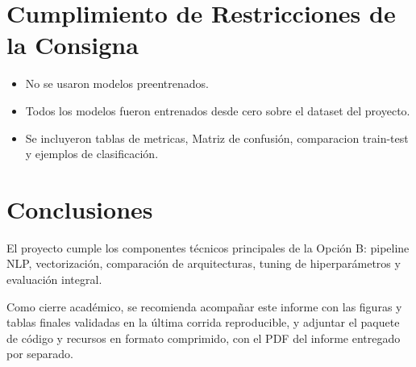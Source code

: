 ﻿\documentclass[12pt,a4paper]{article}
\begin{document}
\section{Cumplimiento de Restricciones de la Consigna}
\begin{itemize}
  \item No se usaron modelos preentrenados.
  \item Todos los modelos fueron entrenados desde cero sobre el dataset del proyecto.
  \item Se incluyeron tablas de metricas, Matriz de confusión, comparacion train-test y ejemplos de clasificación.
\end{itemize}

\section{Conclusiones}
El proyecto cumple los componentes técnicos principales de la Opción B: pipeline NLP, vectorización,
comparación de arquitecturas, tuning de hiperparámetros y evaluación integral.

Como cierre académico, se recomienda acompañar este informe con las figuras y tablas finales validadas en la
última corrida reproducible, y adjuntar el paquete de código y recursos en formato comprimido,
con el PDF del informe entregado por separado.
\end{document}
